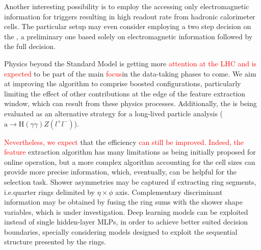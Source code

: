 
Another interesting possibility is to employ the \rnn{} accessing only
electromagnetic information for triggers resulting in high readout rate from
hadronic calorimeter cells. The particular setup may even consider employing a
two step decision on the \fastcalo{}, a preliminary one based solely on
electromagnetic information followed by the full \rnn{} decision.




Physics beyond the Standard Model is getting more \textcolor{red}{attention at the LHC and is expected} to be part of the main \textcolor{red}{focus}in the data-taking phases to
come. We aim at improving the \rnn{} algorithm to comprise boosted
configurations, particularly limiting the effect of other contributions at
the edge of the feature extraction window, which can result from these physics
processes. Additionally, the \rnn{} is being evaluated as an alternative
strategy for a long-lived particle analysis
($\text{a}\rightarrow\text{H}(\gamma\gamma)Z(l^+l^-)$).

\textcolor{red}{Nevertheless, we expect}
that the \rnn{} efficiency \textcolor{red}{can still be improved. Indeed, the feature} extraction
algorithm has many limitations as being initially proposed for online
operation, but a more complex algorithm accounting for the cell sizes can
provide more precise information, which, eventually, can be helpful for the
selection task. Shower asymmetries may be captured if extracting ring segments,
i.e.\@ quarter rings delimited by $\eta\times\phi$ axis. Complementary
discriminant information may be obtained by fusing the ring sums with the shower shape variables,
which is under investigation. Deep learning models can be exploited instead of
single hidden-layer MLPs, in order to achieve better suited decision boundaries,
specially considering models designed to exploit the sequential structure
presented by the rings.


